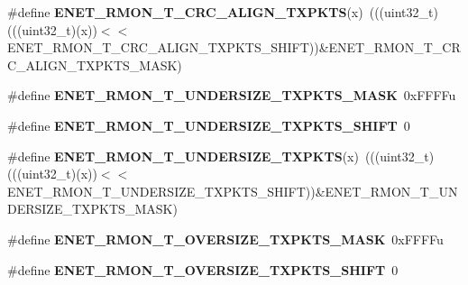 \begin{DoxyCompactItemize}
\item 
\#define {\bfseries E\+N\+E\+T\+\_\+\+R\+M\+O\+N\+\_\+\+T\+\_\+\+C\+R\+C\+\_\+\+A\+L\+I\+G\+N\+\_\+\+T\+X\+P\+K\+TS}(x)~(((uint32\+\_\+t)(((uint32\+\_\+t)(x))$<$$<$E\+N\+E\+T\+\_\+\+R\+M\+O\+N\+\_\+\+T\+\_\+\+C\+R\+C\+\_\+\+A\+L\+I\+G\+N\+\_\+\+T\+X\+P\+K\+T\+S\+\_\+\+S\+H\+I\+FT))\&E\+N\+E\+T\+\_\+\+R\+M\+O\+N\+\_\+\+T\+\_\+\+C\+R\+C\+\_\+\+A\+L\+I\+G\+N\+\_\+\+T\+X\+P\+K\+T\+S\+\_\+\+M\+A\+SK)\hypertarget{group__ENET__Register__Masks_ga46c296756912f29ddce9f6c181f6790d}{}\label{group__ENET__Register__Masks_ga46c296756912f29ddce9f6c181f6790d}

\item 
\#define {\bfseries E\+N\+E\+T\+\_\+\+R\+M\+O\+N\+\_\+\+T\+\_\+\+U\+N\+D\+E\+R\+S\+I\+Z\+E\+\_\+\+T\+X\+P\+K\+T\+S\+\_\+\+M\+A\+SK}~0x\+F\+F\+F\+Fu\hypertarget{group__ENET__Register__Masks_gac79ab5e21dda24e10c602a553f1096bb}{}\label{group__ENET__Register__Masks_gac79ab5e21dda24e10c602a553f1096bb}

\item 
\#define {\bfseries E\+N\+E\+T\+\_\+\+R\+M\+O\+N\+\_\+\+T\+\_\+\+U\+N\+D\+E\+R\+S\+I\+Z\+E\+\_\+\+T\+X\+P\+K\+T\+S\+\_\+\+S\+H\+I\+FT}~0\hypertarget{group__ENET__Register__Masks_ga1e9b9d2818563f7ddb3d266af3e5bbfd}{}\label{group__ENET__Register__Masks_ga1e9b9d2818563f7ddb3d266af3e5bbfd}

\item 
\#define {\bfseries E\+N\+E\+T\+\_\+\+R\+M\+O\+N\+\_\+\+T\+\_\+\+U\+N\+D\+E\+R\+S\+I\+Z\+E\+\_\+\+T\+X\+P\+K\+TS}(x)~(((uint32\+\_\+t)(((uint32\+\_\+t)(x))$<$$<$E\+N\+E\+T\+\_\+\+R\+M\+O\+N\+\_\+\+T\+\_\+\+U\+N\+D\+E\+R\+S\+I\+Z\+E\+\_\+\+T\+X\+P\+K\+T\+S\+\_\+\+S\+H\+I\+FT))\&E\+N\+E\+T\+\_\+\+R\+M\+O\+N\+\_\+\+T\+\_\+\+U\+N\+D\+E\+R\+S\+I\+Z\+E\+\_\+\+T\+X\+P\+K\+T\+S\+\_\+\+M\+A\+SK)\hypertarget{group__ENET__Register__Masks_ga90299d138525aced7aee63953319e8f4}{}\label{group__ENET__Register__Masks_ga90299d138525aced7aee63953319e8f4}

\item 
\#define {\bfseries E\+N\+E\+T\+\_\+\+R\+M\+O\+N\+\_\+\+T\+\_\+\+O\+V\+E\+R\+S\+I\+Z\+E\+\_\+\+T\+X\+P\+K\+T\+S\+\_\+\+M\+A\+SK}~0x\+F\+F\+F\+Fu\hypertarget{group__ENET__Register__Masks_gac24da13e75404927ddc2e7a9f1dc9134}{}\label{group__ENET__Register__Masks_gac24da13e75404927ddc2e7a9f1dc9134}

\item 
\#define {\bfseries E\+N\+E\+T\+\_\+\+R\+M\+O\+N\+\_\+\+T\+\_\+\+O\+V\+E\+R\+S\+I\+Z\+E\+\_\+\+T\+X\+P\+K\+T\+S\+\_\+\+S\+H\+I\+FT}~0\hypertarget{group__ENET__Register__Masks_gaa57896dafe9204df8f2d835281f03114}{}\label{group__ENET__Register__Masks_gaa57896dafe9204df8f2d835281f03114}


\end{DoxyCompactItemize}
